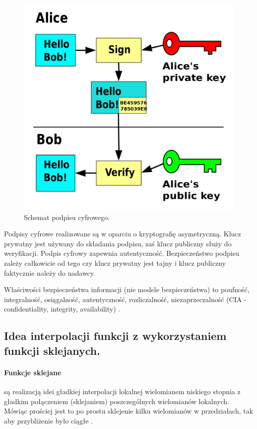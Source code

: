 \documentclass[wi]{zut}
\begin{document}
\begin{figure}[H]
    \centering
    \includegraphics[width=0.5\linewidth]{images/1200px-Private_key_signing.svg.png}
    \caption{Schemat podpisu cyfrowego.}
    \label{fig:digital_signature}
\end{figure}

Podpisy cyfrowe realizowane są w oparciu o kryptografię asymetryczną. Klucz prywatny jest używany do składania podpisu, zaś klucz publiczny służy do weryfikacji. Podpis cyfrowy zapewnia autentyczność. Bezpieczeństwo podpisu zależy całkowicie od tego czy klucz prywatny jest tajny i klucz publiczny faktycznie należy do nadawcy.


Właściwości bezpieczeństwa informacji (nie modele bezpieczeństwa) to poufność, integralność, osiągalność, autentyczność, rozliczalność, niezaprzeczalność (CIA - confidentiality, integrity, availability) \cite{Pejas}.

\question

\subsection{Idea interpolacji funkcji z wykorzystaniem funkcji sklejanych.}

\paragraph{Funkcje sklejane} są realizacją idei gładkiej interpolacji lokalnej wielomianem niskiego stopnia z gładkim połączeniem (sklejaniem) poszczególnych wielomianów lokalnych. Mówiąc prościej jest to po prostu sklejenie kilku wielomianów w przedziałach, tak aby przybliżenie było ciągłe \cite{Piela}.
\end{document}
